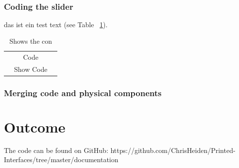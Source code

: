 \documentclass[doc.tex]{subfiles}
\begin{document}
    \subsubsection{Coding the slider}
        \begin{flushleft}
        das ist ein test text (see Table ~\ref{tab:test}).\newline
        \end{flushleft}

        \begin{table}[h]
            \centering
            \begin{tabular}[h]{ccc}
                & Code &  \\
                & Show Code &  \\
            \end{tabular}
            \caption{Shows the con}
            \label{tab:test}
        \end{table}
        \begin{flushleft}
        \end{flushleft}


    \subsubsection{Merging code and physical components}
        \begin{flushleft}
        \end{flushleft}

    \section{Outcome}
        \begin{flushleft}

            The code can be found on GitHub: https://github.com/ChrisHeiden/Printed-Interfaces/tree/master/documentation %
        \end{flushleft}
\end{document}
